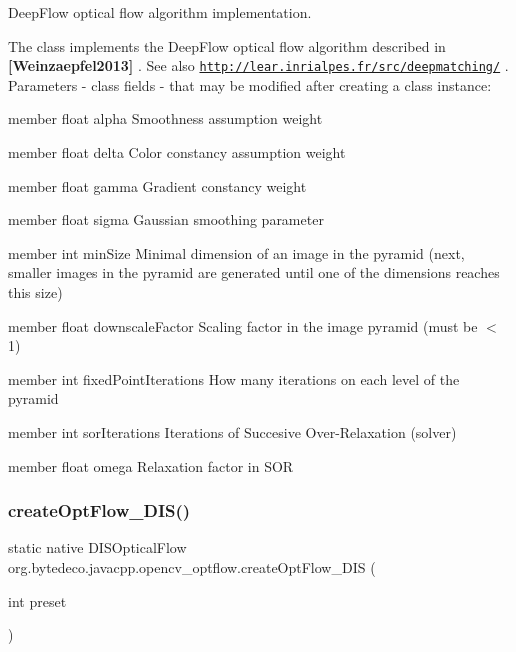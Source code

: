 Deep\+Flow optical flow algorithm implementation. 

The class implements the Deep\+Flow optical flow algorithm described in {\bfseries [Weinzaepfel2013]} . See also \href{http://lear.inrialpes.fr/src/deepmatching/}{\tt http\+://lear.\+inrialpes.\+fr/src/deepmatching/} . Parameters -\/ class fields -\/ that may be modified after creating a class instance\+:
\begin{DoxyItemize}
\item member float alpha Smoothness assumption weight
\item member float delta Color constancy assumption weight
\item member float gamma Gradient constancy weight
\item member float sigma Gaussian smoothing parameter
\item member int min\+Size Minimal dimension of an image in the pyramid (next, smaller images in the pyramid are generated until one of the dimensions reaches this size)
\item member float downscale\+Factor Scaling factor in the image pyramid (must be $<$ 1)
\item member int fixed\+Point\+Iterations How many iterations on each level of the pyramid
\item member int sor\+Iterations Iterations of Succesive Over-\/\+Relaxation (solver)
\item member float omega Relaxation factor in S\+OR 
\end{DoxyItemize}\mbox{\label{group__optflow_gac107283f5dba4f320df3d9894aad537b}} 
\subsubsection{\texorpdfstring{create\+Opt\+Flow\+\_\+\+D\+I\+S()}{createOptFlow\_DIS()}}
{\footnotesize\ttfamily static native D\+I\+S\+Optical\+Flow org.\+bytedeco.\+javacpp.\+opencv\+\_\+optflow.\+create\+Opt\+Flow\+\_\+\+D\+IS (\begin{DoxyParamCaption}\item[{int}]{preset }\end{DoxyParamCaption})\hspace{0.3cm}{\ttfamily [static]}}




